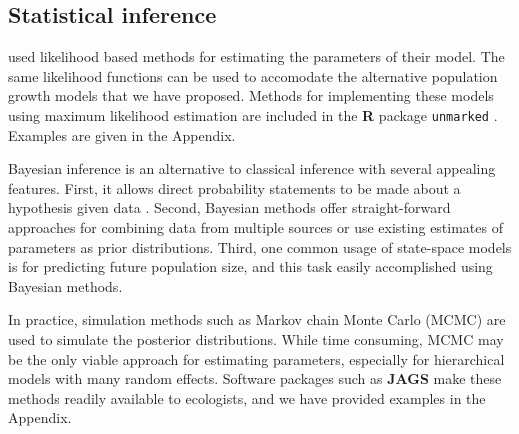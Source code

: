 \documentclass[12pt]{article}
\begin{document}



\subsection{Statistical inference}

\citet{dail_madsen:2011} used likelihood based methods for estimating
the parameters of their model. The same likelihood functions can be
used to accomodate the alternative population growth models that we
have proposed. Methods for implementing these models using maximum 
likelihood estimation are included in the %
\textbf{R} package \texttt{unmarked} \citep{fiske_chandler:2011}. Examples
are given in the Appendix.

Bayesian inference is an alternative to classical inference with
several appealing features. First, it allows direct probability
statements to be made about a hypothesis given data
\citep{link_barker:2010}.  Second, Bayesian methods offer
straight-forward approaches for combining data from multiple sources
or use existing estimates of parameters as prior distributions. Third,
one common usage of state-space models is for predicting future
population size, and this task easily accomplished using Bayesian
methods.

In
practice, simulation methods such as Markov chain Monte Carlo (MCMC)
are used to simulate the posterior distributions. While time
consuming, MCMC may be the only viable approach for estimating
parameters, especially for hierarchical models with many random
effects.  
Software packages such as %
\textbf{JAGS} \citep{plummer:2003} make these methods readily
available to ecologists, and we have provided examples in the
Appendix. 
\end{document}
